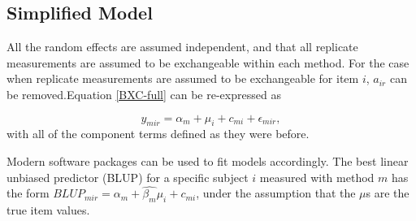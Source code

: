 \documentclass[12pt, a4paper]{report}
\theoremstyle{plain}
\theoremstyle{definition}
\theoremstyle{remark}
\begin{document}


\subsection*{Simplified Model}
All the random effects are assumed independent, and that all replicate measurements are assumed to be exchangeable within each method. For the case when replicate measurements are assumed to be exchangeable for item $i$, $a_{ir}$ can be removed.Equation \ref{BXC-full} can be re-expressed as

\begin{equation}
y_{mir}  = \alpha_{m} + \mu_{i} + c_{mi} + \epsilon_{mir},
\end{equation}
with all of the component terms defined as they were before.

Modern software packages can be used to fit models accordingly. The best linear unbiased predictor (BLUP) for a specific subject $i$ measured with method $m$ has the form $BLUP_{mir} = \hat{\alpha_{m}} +
\hat{\beta_{m}}\mu_{i} + c_{mi}$, under the assumption that the
$\mu$s are the true item values.



%
%


\end{document}
